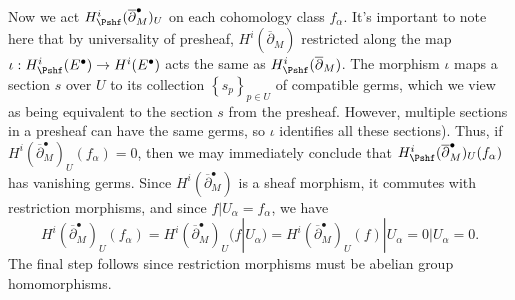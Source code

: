 \begin{discussion}
	Now we act $H^i_{\Pshf } (\overline{\partial } ^{\bullet} _M)_U$ on each cohomology class $f_\alpha $. It's important to note here that by universality of presheaf, $H^i(\overline{\partial }_M)$ restricted along the map $\iota : H^i_{\Pshf } (E^{\bullet} ) \to H^i(E^{\bullet} )$ acts the same as $H^i_{\Pshf } (\overline{\partial } _M)$. The morphism $\iota $ maps a section $s$ over $U$ to its collection $\left\{ s_p \right\} _{p\in U} $ of compatible germs, which we view as being equivalent to the section $s$ from the presheaf. However, multiple sections in a presheaf can have the same germs, so $\iota $ identifies all these sections). Thus, if $H^i(\overline{\partial } ^{\bullet} _M)_U(f_\alpha ) = 0$, then we may immediately conclude that $H^i_{\Pshf }(\overline{\partial } ^{\bullet} _M)_U(f_\alpha )$ has vanishing germs. Since $H^i(\overline{\partial } ^{\bullet} _M)$ is a sheaf morphism, it commutes with restriction morphisms, and since $f|U_\alpha =f_\alpha $, we have
	\[
		H^i(\overline{\partial } ^{\bullet} _M)_U(f_\alpha ) = H^i(\overline{\partial } ^{\bullet} _M)_U(f|U_\alpha )=H^i(\overline{\partial } ^{\bullet} _M)_U(f)|U_\alpha = 0|U_\alpha =0
	.\]
	The final step follows since restriction morphisms must be abelian group homomorphisms.


\end{discussion}
